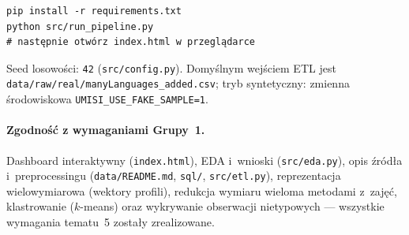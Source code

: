 \documentclass[11pt,a4paper]{article}
\begin{document}
\begin{verbatim}
pip install -r requirements.txt
python src/run_pipeline.py
# następnie otwórz index.html w przeglądarce
\end{verbatim}

Seed losowości: \texttt{42} (\texttt{src/config.py}). Domyślnym wejściem ETL jest
\texttt{data/raw/real/manyLanguages\_added.csv}; tryb syntetyczny: zmienna środowiskowa
\texttt{UMISI\_USE\_FAKE\_SAMPLE=1}.

\paragraph{Zgodność z wymaganiami Grupy~1.} Dashboard interaktywny (\texttt{index.html}),
EDA i~wnioski (\texttt{src/eda.py}), opis źródła i~preprocessingu (\texttt{data/README.md},
\texttt{sql/}, \texttt{src/etl.py}), reprezentacja wielowymiarowa (wektory profili),
redukcja wymiaru wieloma metodami z~zajęć, klastrowanie ($k$-means) oraz wykrywanie obserwacji
nietypowych --- wszystkie wymagania tematu~5 zostały zrealizowane.
\end{document}

